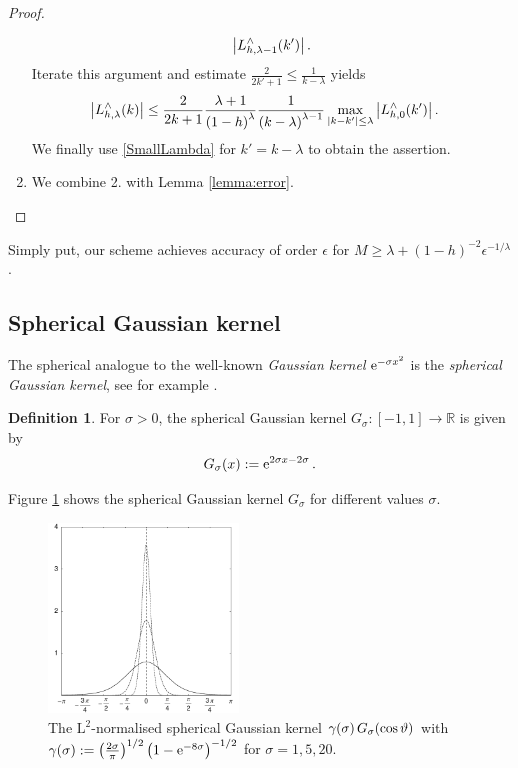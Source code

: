 \documentclass[11pt,a4paper,twoside,bibtotoc]{scrartcl}
\theoremstyle{plain}
\theoremstyle{definition}
\newtheorem{definition}[theorem]{Definition}
\theoremstyle{remark}
\newcommand{\R}{\ensuremath{\mathbb{R}}}
\newcommand{\fun}[2]{\ensuremath{#1{\hspace{-0.4ex}}\left(#2\right)}}
\newcommand{\e}{\mbox{\rm{e}}}
\numberwithin{equation}{section}
\numberwithin{table}{section}
\numberwithin{figure}{section}
\begin{document}
\begin{proof}
\begin{enumerate}
\begin{equation*}
      \left|\fun{L_{h,\lambda-1}^{\wedge}}{k'}\right|.
    \end{equation*}
    Iterate this argument and estimate $\frac{2}{2k'+1}\le
    \frac{1}{k-\lambda}$ yields
    \begin{align*}
      \left|\fun{L_{h,\lambda}^{\wedge}}{k}\right|
      & \le \frac{2}{2k+1} \frac{\lambda+1}{\left(1-h\right)^{\lambda}}
        \frac{1}{\left(k-\lambda\right)^{\lambda-1}} 
        \max_{|k-k'| \le \lambda} 
        \left|\fun{L_{h,0}^{\wedge}}{k'}\right|.
    \end{align*}
    We finally use \eqref{SmallLambda} for $k'=k-\lambda$ to obtain the
    assertion.
  \item We combine 2. with Lemma \ref{lemma:error}. 
  \end{enumerate}
\end{proof}

Simply put, our scheme achieves accuracy of order $\epsilon$ for $M \ge
\lambda + (1-h)^{-2} {\epsilon}^{-1/\lambda}$.

\subsection{Spherical Gaussian kernel}
The spherical analogue to the well-known \emph{Gaussian kernel} $\e^{-\sigma x^2}$ is the 
\emph{spherical Gaussian kernel}, see for example \cite{bahu01}.
\begin{definition}
  For $\sigma>0$, the spherical Gaussian kernel
  $G_{\sigma}:[-1,1] \rightarrow \R$ is given by
  \begin{equation}
    \label{GaussKernel}
    \nonumber
    \fun{G_{\sigma}}{x} := \e^{2\sigma x-2\sigma}\,.
  \end{equation}
\end{definition}

Figure \ref{Basics:Figure:GKernel} shows the spherical Gaussian kernel $G_{\sigma}$ for
different values $\sigma$.
\begin{figure}[tb]
  \centering
  \includegraphics[width=0.45\textwidth]{images/gaussian}
  \caption{The $\text{L}^2$-normalised spherical Gaussian kernel 
  $\fun{\gamma}{\sigma} \fun{G_{\sigma}}{\cos\vartheta}$ with
  $\fun{\gamma}{\sigma} := \left(\frac{2\sigma}{\pi}\right)^{1/2} \left(1-\e^{-8\sigma}\right)^{-1/2}$ for $\sigma = 1,5,20$.}
  \label{Basics:Figure:GKernel}
\end{figure}
\end{document}
